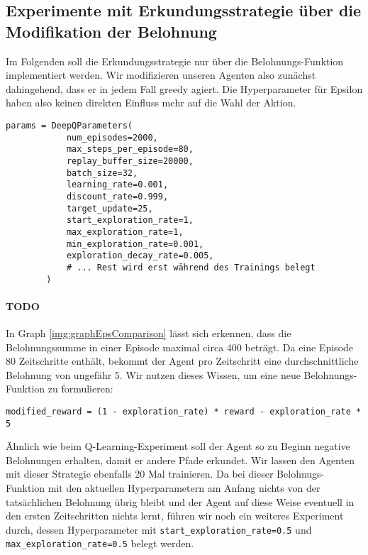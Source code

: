 \subsection{Experimente mit Erkundungsstrategie über die Modifikation der Belohnung}
Im Folgenden soll die Erkundungsstrategie nur über die Belohnungs-Funktion implementiert werden. Wir modifizieren unseren Agenten also zunächst dahingehend, dass er in jedem Fall greedy agiert. Die Hyperparameter für Epsilon haben also keinen direkten Einfluss mehr auf die Wahl der Aktion.
\begin{verbatim}
params = DeepQParameters(
            num_episodes=2000,
            max_steps_per_episode=80,
            replay_buffer_size=20000,
            batch_size=32,
            learning_rate=0.001,
            discount_rate=0.999,
            target_update=25,
            start_exploration_rate=1,
            max_exploration_rate=1,
            min_exploration_rate=0.001,
            exploration_decay_rate=0.005,
            # ... Rest wird erst während des Trainings belegt
        )
\end{verbatim}

\paragraph{TODO}
In Graph \ref{img:graphEpsComparison} lässt sich erkennen, dass die Belohnungssumme in einer Episode maximal circa 400 beträgt. Da eine Episode 80 Zeitschritte enthält, bekommt der Agent pro Zeitschritt eine durchschnittliche Belohnung von ungefähr 5. Wir nutzen dieses Wissen, um eine neue Belohnungs-Funktion zu formulieren:
\begin{verbatim}
modified_reward = (1 - exploration_rate) * reward - exploration_rate * 5
\end{verbatim}
Ähnlich wie beim Q-Learning-Experiment soll der Agent so zu Beginn negative Belohnungen erhalten, damit er andere Pfade erkundet. Wir lassen den Agenten mit dieser Strategie ebenfalls 20 Mal trainieren. Da bei dieser Belohnugs-Funktion mit den aktuellen Hyperparametern am Anfang nichts von der tatsächlichen Belohnung übrig bleibt und der Agent auf diese Weise eventuell in den ersten Zeitschritten nichts lernt, führen wir noch ein weiteres Experiment durch, dessen Hyperparameter mit \texttt{start_exploration_rate=0.5} und \texttt{max_exploration_rate=0.5} belegt werden.

